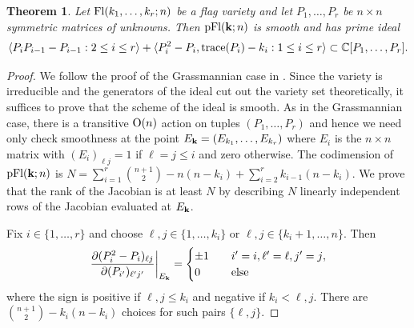 \documentclass[12pt]{extarticle}
\newtheorem{theorem}{Theorem}
\theoremstyle{definition}
\numberwithin{theorem}{section}
\newcommand{\CC}{\mathbb{C}}
\begin{document}
\begin{theorem}\label{thm:projectionideal}
    Let ${\rm Fl}(k_1, \ldots, k_r; n)$ be a flag variety and let $P_1, \ldots, P_r$ be $n \times n$ symmetric matrices of unknowns.
    Then ${\rm pFl}({\bf k}; n)$ is smooth and has prime ideal
    \begin{align*}
          \langle P_{i}P_{i-1} - P_{i-1} : 2 \leq i \leq r \rangle + 
        \langle P_i^2 - P_i, {\rm trace}(P_i) - k_i : 1 \leq i \leq r\rangle \subset \CC[P_1, \ldots, P_r].
    \end{align*}
\end{theorem}
\begin{proof}
    We follow the proof of the Grassmannian case in \cite[Theorem 5.2]{DFRS}.
    Since the variety is irreducible and the generators of the ideal cut out the variety set theoretically, it suffices to prove that the scheme of the ideal is smooth. 
    As in the Grassmannian case, there is a transitive ${\rm O}(n)$ action on tuples $(P_1, \ldots, P_r)$ and hence we need only check smoothness at the point $E_{\bf k} = (E_{k_1}, \ldots, E_{k_r})$ where $E_i$ is the $n \times n$ matrix with $(E_i)_{\ell j} = 1$ if $\ell = j \leq i$ and zero otherwise.
    The codimension of ${\rm pFl}({\bf k}; n)$ is $N = \sum_{i=1}^r \binom{n+1}{2} - n(n-k_i) + \sum_{i=2}^r k_{i-1}(n - k_i)$.
    We prove that the rank of the Jacobian is at least $N$ by describing $N$ linearly independent  rows of the Jacobian evaluated at $E_{\bf k}$. 

    Fix $i \in \{1, \ldots, r\}$ 
    and choose $\ell, j \in \{1, \ldots, k_i\}$ or $\ell, j \in  \{k_i+1,\ldots, n\}$. 
    Then
    \begin{align*}
        \left. \frac{\partial (P_{i}^2 - P_{i})_{\ell j}}{\partial (P_{i'}
)_{\ell'j'}}\right|_{E_{\bf k}} = 
        \begin{cases}
            \pm 1 &\quad \textrm{$i' = i, \ell' = \ell, j' = j$},\\
            0 & \quad \textrm{else}\\
        \end{cases}
    \end{align*}
    where the sign is positive if $\ell, j \leq k_i$ and negative if $k_i < \ell, j$.
    There are $\binom{n+1}{2} - k_i(n - k_i)$ choices for such pairs $\{\ell, j\}$.


\end{proof}
\end{document}

